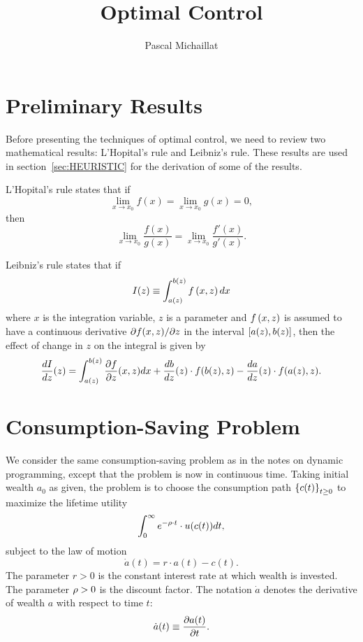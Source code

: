 \documentclass[letterpaper,12pt,leqno]{article}
\begin{document}
\title{Optimal Control}
\author{Pascal Michaillat}
\date{}

\begin{titlepage}
\maketitle
\tableofcontents
\end{titlepage}

\section{Preliminary Results}

Before presenting the techniques of optimal control, we need to review two mathematical results: L'Hopital's rule and Leibniz's rule. These results are used in section~\ref{sec:HEURISTIC} for the derivation of some of the results.

L'Hopital's rule states that if 
\begin{equation*}
\lim_{x\to x_{0}}f(x) =\lim_{x\to x_{0}}g(x) =0,
\end{equation*}
then 
\begin{equation*}
\lim_{x\to x_{0}}\frac{f(x)}{g(x)}=\lim_{x\to x_{0}}\frac{f'(x) }{g'(x)}.
\end{equation*}

Leibniz's rule states that if
\begin{equation*}
I(z) \equiv \int_{a(z) }^{b(z)}f\left( x,z \right) dx
\end{equation*}
where $x$ is the integration variable, $z$ is a parameter and $f\left(  x,z \right) $
is assumed to have a continuous derivative $\partial f(x,z)/\partial z$ in the
interval $\left[ a(z),b(z) \right]$, then the effect of change in $z$ on the integral is given by
\begin{equation*}
\frac{d I}{d z}(z) =\int_{a(z)}^{b(z)} \frac{\partial f}{\partial z}(x,z) dx+\frac{d b}{d z}(z) \cdot f( b(z),z) -\frac{d a}{d z}(z) \cdot f(a(z) ,z).
\end{equation*}

\section{Consumption-Saving Problem}

We consider the same consumption-saving problem as in the notes on dynamic programming, except that the problem is now in continuous time. Taking initial wealth $a_{0}$ as given, the problem is to choose the consumption path $\left\lbrace c(t) \right\rbrace_{t\geq 0}$ to maximize the lifetime utility
\begin{align}
\int_{0}^{\infty}e^{-\rho \cdot t}\cdot u(c(t)) dt \label{eq:cont},
\end{align}
subject to the law of motion
\begin{equation}
\dot{a}(t) = r\cdot a(t)-c(t).\label{eq:LAW}
\end{equation}  
The parameter $r>0$ is the constant interest rate at which wealth is invested. The parameter $\rho>0$ is the discount factor. The notation $\dot{a}$ denotes the derivative of wealth $a$ with respect to time $t$:
\[\dot{a}(t)\equiv \frac{\partial a(t)}{\partial t}.\] 
\end{document}
